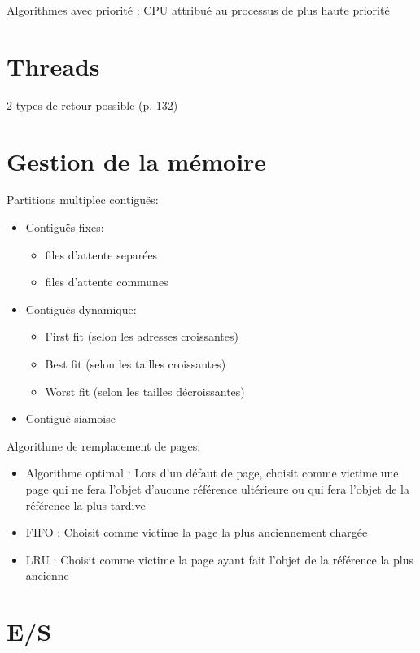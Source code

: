 \documentclass[11pt,a4paper,oneside,french,svgnames]{report}
\begin{document}
Algorithmes avec priorité :  CPU attribué au processus de plus haute priorité


\section*{Threads}

2 types de retour possible (p. 132)

\section*{Gestion de la mémoire}
Partitions  multiplec contiguës:
\begin{itemize}
\item Contiguës fixes:
\begin{itemize}
\item files d'attente separées
\item files d'attente communes
\end{itemize}
\item Contiguës dynamique:
\begin{itemize}
\item First fit (selon les adresses croissantes)
\item Best fit (selon les tailles croissantes)
\item Worst fit (selon les tailles décroissantes)
\end{itemize}
\item Contiguë siamoise
\end{itemize}

Algorithme de remplacement de pages:
\begin{itemize}
\item Algorithme optimal : Lors d'un défaut de page, choisit comme victime une page qui ne fera l'objet d'aucune référence ultérieure  ou qui fera l'objet de la référence la plus tardive
\item FIFO : Choisit comme victime la page la plus anciennement chargée
\item LRU  : Choisit comme victime la page ayant fait l'objet de la référence la plus ancienne
\end{itemize}


\section*{E/S}
\end{document}
